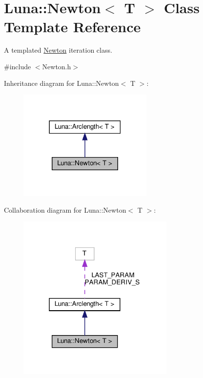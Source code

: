 \hypertarget{classLuna_1_1Newton}{}\section{Luna\+:\+:Newton$<$ T $>$ Class Template Reference}
\label{classLuna_1_1Newton}


A templated \hyperlink{classLuna_1_1Newton}{Newton} iteration class.  




{\ttfamily \#include $<$Newton.\+h$>$}



Inheritance diagram for Luna\+:\+:Newton$<$ T $>$\+:\nopagebreak
\begin{figure}[H]
\begin{center}
\leavevmode
\includegraphics[width=189pt]{classLuna_1_1Newton__inherit__graph}
\end{center}
\end{figure}


Collaboration diagram for Luna\+:\+:Newton$<$ T $>$\+:\nopagebreak
\begin{figure}[H]
\begin{center}
\leavevmode
\includegraphics[width=220pt]{classLuna_1_1Newton__coll__graph}
\end{center}
\end{figure}
